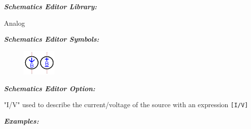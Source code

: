 \textbf{\textit{Schematics Editor Library:}}

Analog

\textbf{\textit{Schematics Editor Symbols:}}

\begin{figure}[htb]
  \begin{center}
    \includegraphics[width=0.15\textwidth]{./pics/SpiceEl/BSource.png}
  \end{center}
\end{figure}

\textbf{\textit{Schematics Editor Option:}}

"\textsf{I/V}" used to describe the current/voltage of the source with an expression \texttt{[I/V]}


\textbf{\textit{Examples:}}

